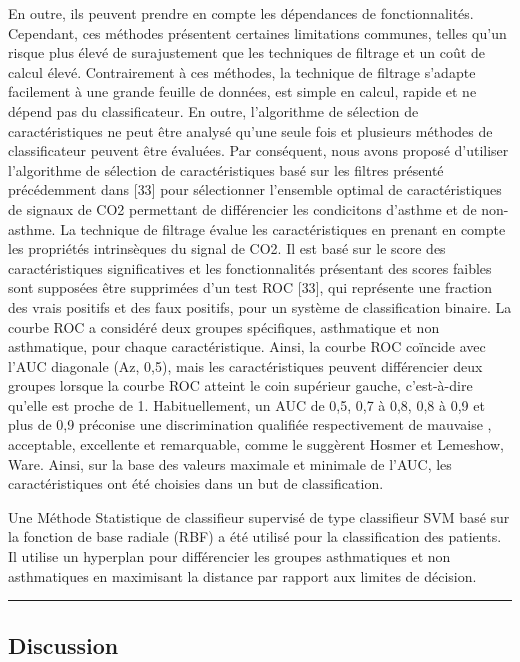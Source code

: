 \documentclass[12pt,]{article}
\begin{document}
En outre, ils peuvent prendre en compte les dépendances de
fonctionnalités. Cependant, ces méthodes présentent certaines
limitations communes, telles qu'un risque plus élevé de surajustement
que les techniques de filtrage et un coût de calcul élevé. Contrairement
à ces méthodes, la technique de filtrage s'adapte facilement à une
grande feuille de données, est simple en calcul, rapide et ne dépend pas
du classificateur. En outre, l'algorithme de sélection de
caractéristiques ne peut être analysé qu'une seule fois et plusieurs
méthodes de classificateur peuvent être évaluées. Par conséquent, nous
avons proposé d'utiliser l'algorithme de sélection de caractéristiques
basé sur les filtres présenté précédemment dans {[}33{]} pour
sélectionner l'ensemble optimal de caractéristiques de signaux de CO2
permettant de différencier les condicitons d'asthme et de non-asthme. La
technique de filtrage évalue les caractéristiques en prenant en compte
les propriétés intrinsèques du signal de CO2. Il est basé sur le score
des caractéristiques significatives et les fonctionnalités présentant
des scores faibles sont supposées être supprimées d'un test ROC
{[}33{]}, qui représente une fraction des vrais positifs et des faux
positifs, pour un système de classification binaire. La courbe ROC a
considéré deux groupes spécifiques, asthmatique et non asthmatique, pour
chaque caractéristique. Ainsi, la courbe ROC coïncide avec l'AUC
diagonale (Az, 0,5), mais les caractéristiques peuvent différencier deux
groupes lorsque la courbe ROC atteint le coin supérieur gauche,
c'est-à-dire qu'elle est proche de 1. Habituellement, un AUC de 0,5, 0,7
à 0,8, 0,8 à 0,9 et plus de 0,9 préconise une discrimination qualifiée
respectivement de mauvaise , acceptable, excellente et remarquable,
comme le suggèrent Hosmer et Lemeshow, Ware. Ainsi, sur la base des
valeurs maximale et minimale de l'AUC, les caractéristiques ont été
choisies dans un but de classification.

Une Méthode Statistique de classifieur supervisé de type classifieur SVM
basé sur la fonction de base radiale (RBF) a été utilisé pour la
classification des patients. Il utilise un hyperplan pour différencier
les groupes asthmatiques et non asthmatiques en maximisant la distance
par rapport aux limites de décision.

\begin{center}\rule{0.5\linewidth}{0.5pt}\end{center}

\hypertarget{discussion}{%
\subsection{Discussion}\label{discussion}}
\end{document}
